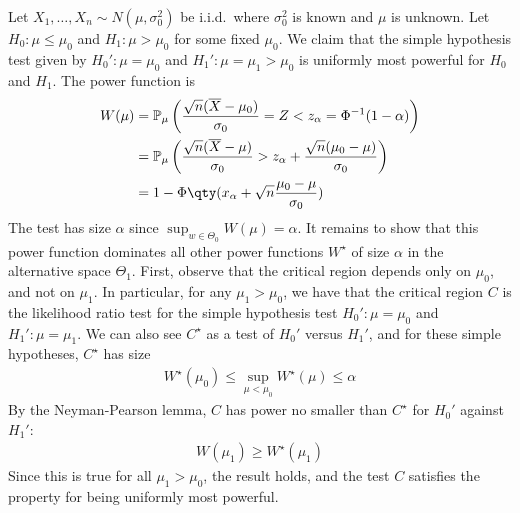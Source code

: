 \begin{example}
	Let $X_1, \dots, X_n \sim N(\mu, \sigma_0^2)$ be i.i.d.\ where $\sigma_0^2$ is known and $\mu$ is unknown.
	Let $H_0 \colon \mu \leq \mu_0$ and $H_1 \colon \mu > \mu_0$ for some fixed $\mu_0$.
	We claim that the simple hypothesis test given by $H_0' \colon \mu = \mu_0$ and $H_1' \colon \mu = \mu_1 > \mu_0$ is uniformly most powerful for $H_0$ and $H_1$.
	The power function is
	\begin{align*}
		W(\mu) & = \psub{\mu}{\frac{\sqrt{n}(\overline X-\mu_0)}{\sigma_0} = Z < z_\alpha = \Phi^{-1}(1-\alpha)}                \\
		       & = \psub{\mu}{\frac{\sqrt{n}(\overline X - \mu)}{\sigma_0} > z_\alpha + \frac{\sqrt{n}(\mu_0 - \mu)}{\sigma_0}} \\
		       & = 1 - \Phi\qty(x_\alpha + \sqrt{n} \frac{\mu_0 - \mu}{\sigma_0})
	\end{align*}
	The test has size $\alpha$ since $\sup_{w \in \Theta_0} W(\mu) = \alpha$.
	It remains to show that this power function dominates all other power functions $W^\star$ of size $\alpha$ in the alternative space $\Theta_1$.
	First, observe that the critical region depends only on $\mu_0$, and not on $\mu_1$.
	In particular, for any $\mu_1 > \mu_0$, we have that the critical region $C$ is the likelihood ratio test for the simple hypothesis test $H_0' \colon \mu = \mu_0$ and $H_1' \colon \mu = \mu_1$.
	We can also see $C^\star$ as a test of $H_0'$ versus $H_1'$, and for these simple hypotheses, $C^\star$ has size
	\begin{align*}
		W^\star(\mu_0) \leq \sup_{\mu < \mu_0} W^\star(\mu) \leq \alpha
	\end{align*}
	By the Neyman-Pearson lemma, $C$ has power no smaller than $C^\star$ for $H_0'$ against $H_1'$:
	\begin{align*}
		W(\mu_1) \geq W^\star(\mu_1)
	\end{align*}
	Since this is true for all $\mu_1 > \mu_0$, the result holds, and the test $C$ satisfies the property for being uniformly most powerful.
\end{example}

